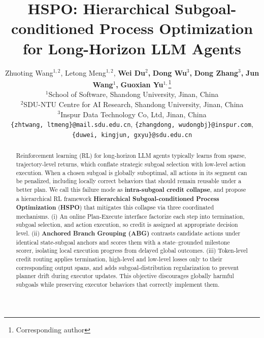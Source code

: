 \documentclass{article}
\title{HSPO: Hierarchical Subgoal-conditioned Process Optimization for Long-Horizon LLM Agents}
\author{
Zhuoting Wang$^{1,2}$, Letong Meng$^{1,2}$, 
\textbf{Wei Du}$^2$\textbf{,} \textbf{Dong Wu}$^3$\textbf{,} \textbf{Dong Zhang}$^3$\textbf{,} \textbf{Jun Wang}$^1$\textbf{,} \textbf{Guoxian Yu}$^{1,}$\thanks{Corresponding author} \\
$^1$School of Software, Shandong University, Jinan, China \\
$^2$SDU-NTU Centre for AI Research, Shandong University, Jinan, China \\
$^3$Inspur Data Technology Co, Ltd, Jinan, China\\
\texttt{\{zhtwang, ltmeng\}@mail.sdu.edu.cn},  \texttt{\{zhangdong, wudongbj\}@inspur.com}, \\ \texttt{\{duwei, kingjun, gxyu\}@sdu.edu.cn}
}
\begin{document}
\maketitle
\begin{abstract}
Reinforcement learning (RL) for long-horizon LLM agents typically learns from sparse, trajectory-level returns, which conflate strategic subgoal selection with low-level action execution. When a chosen subgoal is globally suboptimal, all actions in its segment can be penalized, including locally correct behaviors that should remain reusable under a better plan. We call this failure mode as \textbf{intra-subgoal credit collapse}, and propose a hierarchical RL framework \textbf{Hierarchical Subgoal-conditioned Process Optimization} (\textbf{HSPO}) that mitigates this collapse via three coordinated mechanisms. (i) An online Plan-Execute interface factorize each step into termination, subgoal selection, and action execution, so credit is assigned at appropriate decision level. (ii)  \textbf{Anchored Branch Grouping (ABG)} contrasts candidate actions under identical state-subgoal anchors and scores them with a state--grounded milestone scorer, isolating local execution progress from delayed global outcomes. (iii) Token-level credit routing applies termination, high-level and low-level losses only to their corresponding output spans, and adds subgoal-distribution regularization to prevent planner drift during executor updates. This objective discourages globally harmful subgoals while preserving executor behaviors that correctly implement them.%
\end{abstract}
\end{document}
